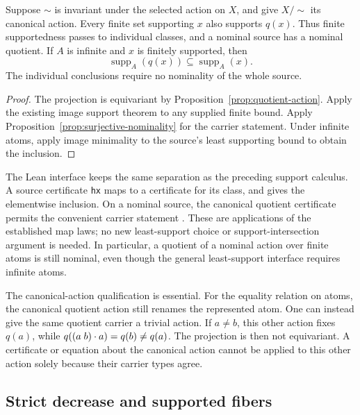 \begin{proposition}
\label{prop:quotient-support}
Suppose $\sim$ is invariant under the selected action on $X$, and give
$X/{\sim}$ its canonical action. Every finite set supporting $x$ also
supports $q(x)$. Thus finite supportedness passes to individual classes,
and a nominal source has a nominal quotient. If $A$ is infinite and $x$
is finitely supported, then
\[
  \operatorname{supp}_A(q(x))\subseteq\operatorname{supp}_A(x).
\]
The individual conclusions require no nominality of the whole source.
\end{proposition}

\begin{proof}
The projection is equivariant by Proposition~\ref{prop:quotient-action}.
Apply the existing image support theorem to any supplied finite bound.
Apply Proposition~\ref{prop:surjective-nominality} for the carrier statement.
Under infinite atoms, apply image minimality to the source's least supporting
bound to obtain the inclusion.
\end{proof}

The Lean interface keeps the same separation as the preceding support
calculus. A source certificate \texttt{hx} maps to a certificate for its
class, and  gives the elementwise
inclusion. On a nominal source, the canonical quotient certificate permits
the convenient carrier statement .
These are applications of the established map laws; no new least-support
choice or support-intersection argument is needed. In particular, a quotient
of a nominal action over finite atoms is still nominal, even though the
general least-support interface requires infinite atoms.

The canonical-action qualification is essential. For the equality relation
on atoms, the canonical quotient action still renames the represented atom.
One can instead give the same quotient carrier a trivial action. If $a\ne b$,
this other action fixes $q(a)$, while
$q((a\;b)\mathbin{\cdot} a)=q(b)\ne q(a)$. The projection is then not equivariant.
A certificate or equation about the canonical action cannot be applied to
this other action solely because their carrier types agree.

\subsection{Strict decrease and supported fibers}

